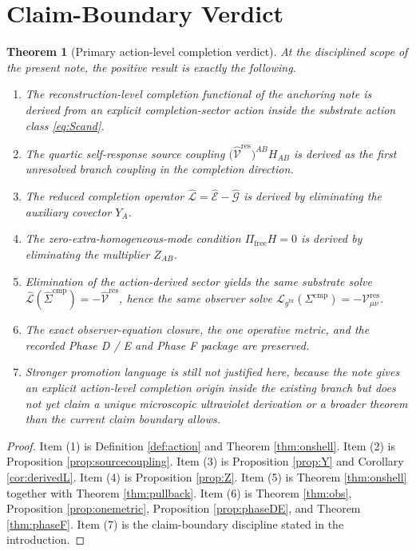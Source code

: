\documentclass[11pt]{article}
\newcommand{\ObserverMetric}{g^{\mathrm{br}}}
\newcommand{\CompShift}{\Sigma^{\mathrm{cmp}}}
\newcommand{\CompLift}{\widehat\Sigma^{\mathrm{cmp}}}
\newcommand{\ResidualCore}{\mathcal V_{\mu\nu}^{\mathrm{res}}}
\newcommand{\ResidualLift}{\widehat{\mathcal V}^{\mathrm{res}}}
\newcommand{\SubEinLin}{\widehat{\mathcal E}}
\newcommand{\SubGaugeBook}{\widehat{\mathcal G}}
\newcommand{\SubReducedEin}{\widehat{\mathcal L}}
\newcommand{\FreeProj}{\Pi_{\mathrm{free}}}
\newcommand{\GaugeAux}{Y}
\newcommand{\ModeAux}{Z}
\newcommand{\ReducedEin}{\mathcal L_{\ObserverMetric}}
\newtheorem{theorem}{Theorem}
\begin{document}
\section{Claim-Boundary Verdict}

\begin{theorem}[Primary action-level completion verdict]
\label{thm:verdict}
At the disciplined scope of the present note, the positive result is exactly the following.
\begin{enumerate}
    \item The reconstruction-level completion functional of the anchoring note is derived from an explicit completion-sector action inside the substrate action class \eqref{eq:Scand}.
    \item The quartic self-response source coupling \(\bigl(\ResidualLift\bigr)^{AB}H_{AB}\) is derived as the first unresolved branch coupling in the completion direction.
    \item The reduced completion operator \(\SubReducedEin=\SubEinLin-\SubGaugeBook\) is derived by eliminating the auxiliary covector \(\GaugeAux_A\).
    \item The zero-extra-homogeneous-mode condition \(\FreeProj H=0\) is derived by eliminating the multiplier \(\ModeAux_{AB}\).
    \item Elimination of the action-derived sector yields the same substrate solve \(\SubReducedEin(\CompLift)=-\ResidualLift\), hence the same observer solve \(\ReducedEin(\CompShift)=-\ResidualCore\).
    \item The exact observer-equation closure, the one operative metric, and the recorded Phase D / E and Phase F package are preserved.
    \item Stronger promotion language is still not justified here, because the note gives an explicit action-level completion origin inside the existing branch but does not yet claim a unique microscopic ultraviolet derivation or a broader theorem than the current claim boundary allows.
\end{enumerate}
\end{theorem}

\begin{proof}
Item (1) is Definition \ref{def:action} and Theorem \ref{thm:onshell}. Item (2) is Proposition \ref{prop:sourcecoupling}. Item (3) is Proposition \ref{prop:Y} and Corollary \ref{cor:derivedL}. Item (4) is Proposition \ref{prop:Z}. Item (5) is Theorem \ref{thm:onshell} together with Theorem \ref{thm:pullback}. Item (6) is Theorem \ref{thm:obs}, Proposition \ref{prop:onemetric}, Proposition \ref{prop:phaseDE}, and Theorem \ref{thm:phaseF}. Item (7) is the claim-boundary discipline stated in the introduction.
\end{proof}
\end{document}

